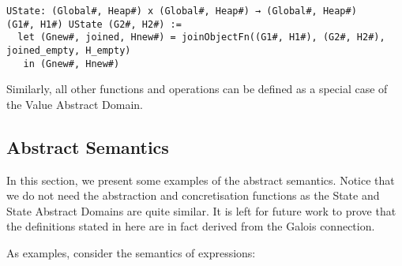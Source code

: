 \begin{verbatim}
UState: (Global#, Heap#) x (Global#, Heap#) → (Global#, Heap#)
(G1#, H1#) UState (G2#, H2#) :=
  let (Gnew#, joined, Hnew#) = joinObjectFn((G1#, H1#), (G2#, H2#), joined_empty, H_empty)
   in (Gnew#, Hnew#)
\end{verbatim}

Similarly, all other functions and operations can be defined as a special
case of the Value Abstract Domain.

\subsection{Abstract Semantics}\label{abstract-semantics-1}

In this section, we present some examples of the abstract semantics.
Notice that we do not need the abstraction and concretisation
functions as the State and State Abstract Domains are quite similar. It
is left for future work to prove that the definitions stated in here are
in fact derived from the Galois connection.

As examples, consider the semantics of expressions:

